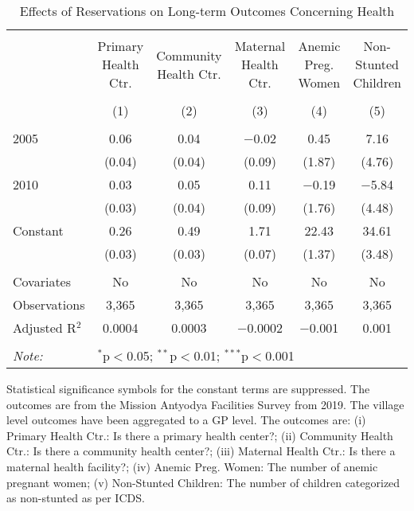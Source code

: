 \begin{sidewaystable}[!htbp]
\centering
\begin{threeparttable}

  \caption{Effects of Reservations on Long-term Outcomes Concerning Health} 
  \label{raj_shrug_health_05_10} 
\scriptsize 
\begin{tabular}{@{\extracolsep{0pt}}lccccc} 
\\[-1.8ex]\hline 
\hline \\[-1.8ex] 
 & Primary Health Ctr. & Community Health Ctr. & Maternal Health Ctr. & Anemic Preg. Women & Non-Stunted Children \\ 
\\[-1.8ex] & (1) & (2) & (3) & (4) & (5)\\ 
\hline \\[-1.8ex] 
 2005 & 0.06 & 0.04 & $-$0.02 & 0.45 & 7.16 \\ 
  & (0.04) & (0.04) & (0.09) & (1.87) & (4.76) \\ 
  2010 & 0.03 & 0.05 & 0.11 & $-$0.19 & $-$5.84 \\ 
  & (0.03) & (0.04) & (0.09) & (1.76) & (4.48) \\ 
  Constant & 0.26 & 0.49 & 1.71 & 22.43 & 34.61 \\ 
  & (0.03) & (0.03) & (0.07) & (1.37) & (3.48) \\ 
 \hline \\[-1.8ex] 
Covariates & No & No & No & No & No \\ 
Observations & 3,365 & 3,365 & 3,365 & 3,365 & 3,365 \\ 
Adjusted R$^{2}$ & 0.0004 & 0.0003 & $-$0.0002 & $-$0.001 & 0.001 \\ 
\hline 
\hline \\[-1.8ex] 
\textit{Note:}  & \multicolumn{5}{l}{$^{*}$p$<$0.05; $^{**}$p$<$0.01; $^{***}$p$<$0.001} \\ 
\end{tabular} 
\begin{tablenotes}[flushleft]
\setlength{\itemindent}{0em}
\scriptsize
\item Statistical significance symbols for the constant terms are suppressed. The outcomes are from the Mission Antyodya Facilities Survey from 2019. The village level outcomes have been aggregated to a GP level. The outcomes are:
                    (i) Primary Health Ctr.: Is there a primary health center?;
                    (ii) Community Health Ctr.: Is there a community health center?;
                    (iii) Maternal Health Ctr.: Is there a maternal health facility?;
                    (iv) Anemic Preg. Women: The number of anemic pregnant women;
                    (v) Non-Stunted Children: The number of children categorized as non-stunted as per ICDS.
\end{tablenotes}
\end{threeparttable}
\end{sidewaystable}
